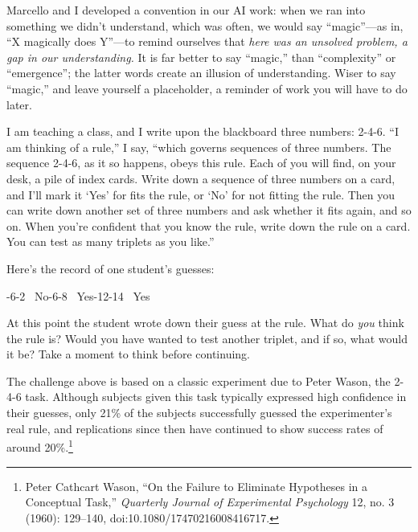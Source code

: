 {
 Marcello and I developed a convention in our AI work: when we ran
into something we didn't understand, which was often,
we would say ``magic''---as in,
``X magically does Y''---to remind
ourselves that \textit{here was an unsolved problem, a gap in our
understanding.} It is far better to say
``magic,'' than
``complexity'' or
``emergence''; the latter words
create an illusion of understanding. Wiser to say
``magic,'' and leave yourself a
placeholder, a reminder of work you will have to do later.}

\myendsectiontext


{
 I am teaching a class, and I write upon the blackboard three
numbers: 2-4-6. ``I am thinking of a
rule,'' I say, ``which governs
sequences of three numbers. The sequence 2-4-6, as it so happens, obeys
this rule. Each of you will find, on your desk, a pile of index cards.
Write down a sequence of three numbers on a card, and
I'll mark it `Yes' for
fits the rule, or `No' for not fitting
the rule. Then you can write down another set of three numbers and ask
whether it fits again, and so on. When you're confident
that you know the rule, write down the rule on a card. You can test as
many triplets as you like.'' }

{
 Here's the record of one student's
guesses:\newline
}

{-6-2 ~No-6-8 ~Yes-12-14 ~Yes
\par}


\bigskip

{
 At this point the student wrote down their guess at the rule. What
do \textit{you} think the rule is? Would you have wanted to test
another triplet, and if so, what would it be? Take a moment to think
before continuing. }

{
 The challenge above is based on a classic experiment due to Peter
Wason, the 2-4-6 task. Although subjects given this task typically
expressed high confidence in their guesses, only 21\% of the subjects
successfully guessed the experimenter's real rule, and
replications since then have continued to show success rates of around
20\%.\footnote{Peter Cathcart Wason, ``On the Failure to
Eliminate Hypotheses in a Conceptual Task,''
\textit{Quarterly Journal of Experimental Psychology} 12, no. 3 (1960):
129--140, doi:10.1080/17470216008416717.}}

